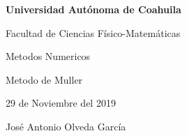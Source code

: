 \documentclass{article}
\begin{document}
\begin{center}
{\Large \textbf{Universidad Autónoma de Coahuila}}
\end{center}

\begin{center}
{\large Facultad de Ciencias Físico-Matemáticas}
\end{center}

\begin{center}
{\large Metodos Numericos}
\end{center}

\begin{center}
{\large Metodo de Muller}
\end{center}

\begin{center}
{\large 29 de Noviembre del 2019}
\end{center}

\begin{center}
{\large José Antonio Olveda García}
\end{center}

\vspace{5mm}
\end{document}
